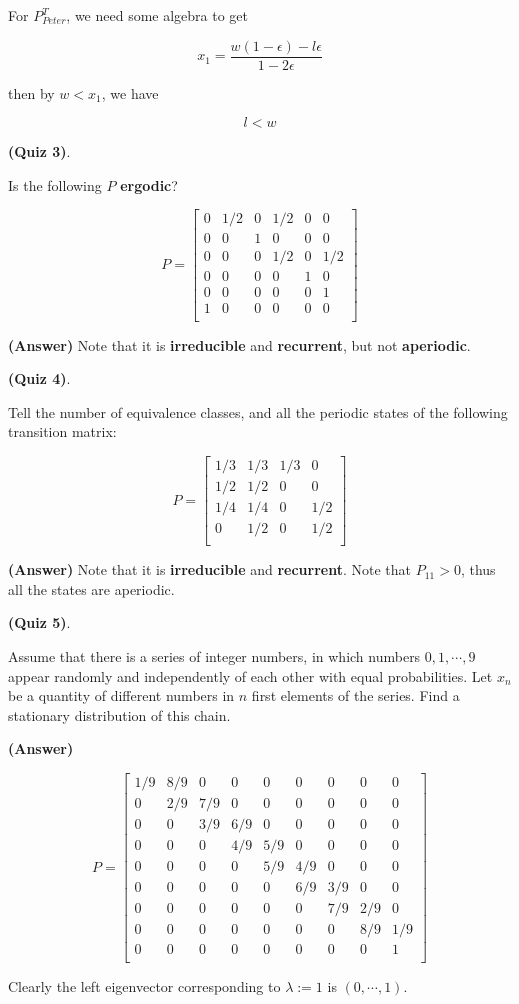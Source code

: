 \documentclass[12pt]{article}
\theoremstyle{nonumberbreak}
\begin{document}
For $P_{Peter}^T$, we need some algebra to get

$$
x_1 = \frac{w(1-\epsilon) - l\epsilon}{1-2\epsilon}
$$

then by $w < x_1$, we have

$$
l < w
$$



\textbf{(Quiz 3)}. 

Is the following $P$ \textbf{ergodic}?

$$
P = \begin{bmatrix}
0 & 1/2 & 0 & 1/2 & 0 & 0 \\
0 & 0 & 1 & 0 & 0 & 0 \\
0 & 0 & 0 & 1/2 & 0 & 1/2 \\
0 & 0 & 0 & 0 & 1 & 0 \\
0 & 0 & 0 & 0 & 0 & 1 \\
1 & 0 & 0 & 0 & 0 & 0 \\
\end{bmatrix}
$$


\textbf{(Answer)} Note that it is \textbf{irreducible} and \textbf{recurrent}, but not \textbf{aperiodic}.


\textbf{(Quiz 4)}. 

Tell the number of equivalence classes, and all the periodic states of the following transition matrix:

$$
P = \begin{bmatrix}
1/3 & 1/3 & 1/3 & 0 \\
1/2 & 1/2 & 0 & 0 \\
1/4 & 1/4 & 0 & 1/2 \\
0 & 1/2 & 0 & 1/2 \\
\end{bmatrix}
$$

\textbf{(Answer)} Note that it is \textbf{irreducible} and \textbf{recurrent}. Note that $P_{11} > 0$, thus all the states are aperiodic. 


\textbf{(Quiz 5)}. 

Assume that there is a series of integer numbers, in which numbers $0,1,\cdots, 9$ appear randomly and independently of each other with equal probabilities. Let $x_n$ be a quantity of different numbers in $n$ first elements of the series. Find a stationary distribution of this chain.

\textbf{(Answer)}

$$
P = \begin{bmatrix}
1/9 & 8/9 & 0 & 0 & 0 & 0 & 0 & 0 & 0 \\
0 & 2/9 & 7/9 & 0 & 0 & 0 & 0 & 0 & 0 \\
0 & 0 & 3/9 & 6/9 & 0 & 0 & 0 & 0 & 0 \\
0 & 0 & 0 & 4/9 & 5/9 & 0 & 0 & 0 & 0 \\
0 & 0 & 0 & 0 & 5/9 & 4/9 & 0 & 0 & 0 \\
0 & 0 & 0 & 0 & 0 & 6/9 & 3/9 & 0 & 0 \\
0 & 0 & 0 & 0 & 0 & 0 & 7/9 & 2/9 & 0 \\
0 & 0 & 0 & 0 & 0 & 0 & 0 & 8/9 & 1/9 \\
0 & 0 & 0 & 0 & 0 & 0 & 0 & 0 & 1 \\
\end{bmatrix}
$$

Clearly the left eigenvector corresponding to $\lambda:=1$ is $(0, \cdots, 1)$. 
\end{document}
